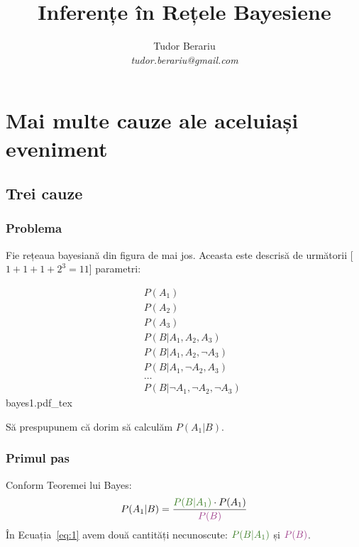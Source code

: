 \documentclass[12pt]{article}
\title{Inferențe în Rețele Bayesiene}
\author{Tudor Berariu \\ \emph{tudor.berariu@gmail.com}}
\begin{document}
\maketitle

\section{Mai multe cauze ale aceluiași eveniment}
\label{mc}

\subsection{Trei cauze}
\label{sec:trei}

\subsubsection*{Problema}
\label{prob1}

Fie rețeaua bayesiană din figura de mai jos. Aceasta este
descrisă de următorii [$1 + 1 + 1 + 2^3 = 11$] parametri:
\begin{multicols}{2}
  \begin{eqnarray*}
    & & P(A_1) \\
    & & P(A_2) \\
    & & P(A_3) \\
    & & P(B \vert A_1, A_2, A_3) \\
    & & P(B \vert A_1, A_2, \neg A_3) \\
    & & P(B \vert A_1, \neg A_2, A_3) \\
    & & \ldots \\
    & & P(B \vert \neg A_1, \neg A_2, \neg A_3)
  \end{eqnarray*}
  \vfill
  \def\svgwidth{6cm}
  {bayes1.pdf_tex}
\end{multicols}

Să prespupunem că dorim să calculăm $P(A_1 \vert B)$.

\subsubsection*{Primul pas}
\label{step1}

Conform Teoremei lui Bayes:
\begin{equation}
  \label{eq:1}
  P(A_1 \vert B) = \dfrac{{\color{OliveGreen} P(B \vert A_1)} \cdot P(A_1)}{{\color{DarkOrchid}P(B)}}
\end{equation}
În Ecuația~\ref{eq:1} avem două cantități necunoscute: ${\color{OliveGreen} P(B \vert A_1)}$ și ${\color{DarkOrchid}P(B)}$.
\end{document}
